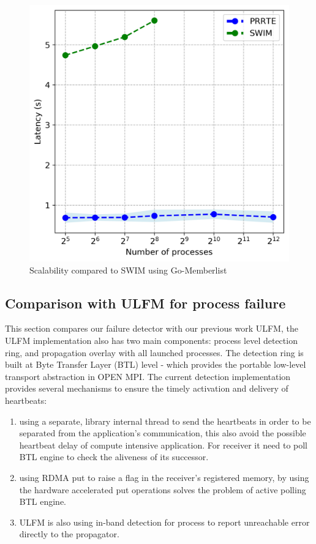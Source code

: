 \documentclass[sigconf]{acmart}
\begin{document}
\begin{figure}[h]
  \centering
  \includegraphics[width=\linewidth]{Scale_prrte_swim.png}
  \caption{Scalability compared to SWIM using Go-Memberlist}
\end{figure}

\subsection{Comparison with ULFM for process failure}
This section compares our failure detector with our previous work ULFM\cite{George18}, the ULFM implementation also has two main components: process level detection ring, and propagation overlay with all launched processes. The detection ring is built at Byte Transfer Layer (BTL) level - which provides the portable low-level transport abstraction in OPEN MPI. The current detection implementation provides several mechanisms to ensure the timely activation and delivery of heartbeats:
\begin{enumerate}
  \item using a separate, library internal thread to send the heartbeats in order to be separated from the application's communication, this also avoid the possible heartbeat delay of compute intensive application. For receiver it need to poll BTL engine to check the aliveness of its successor. 
  \item using RDMA put to raise a flag in the receiver's registered memory, by using the hardware accelerated put operations solves the problem of active polling BTL engine. 
  \item ULFM is also using in-band detection for process to report unreachable error directly to the propagator.
\end{enumerate}
\end{document}
